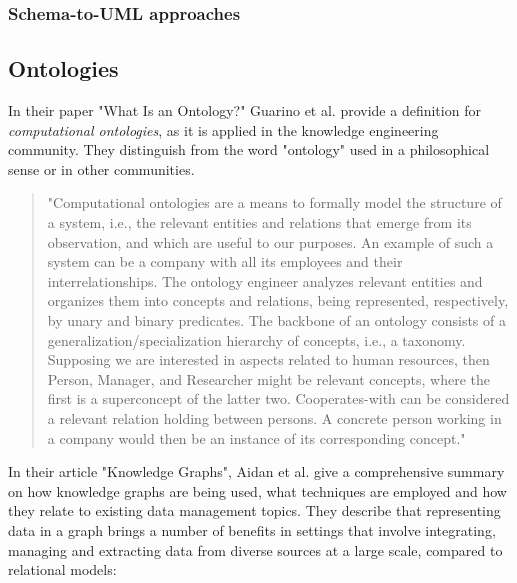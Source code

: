 \subsubsection{Schema-to-UML approaches}\label{subsubsec:schema-to-uml}

\subsection{Ontologies}
In their paper "What Is an Ontology?" Guarino et al. provide a definition for \textit{computational ontologies}, as it is applied in the knowledge engineering community.
They distinguish from the word "ontology" used in a philosophical sense or in other communities.\cite{guarino2009ontology}
\begin{quote}
	"Computational ontologies are a means to formally model the structure of a system, i.e., the relevant entities and relations that emerge from its observation, and which are useful to our purposes. An example of such a system can be a company with all its employees and their interrelationships. The ontology engineer analyzes relevant entities and organizes them into concepts and relations, being represented, respectively, by unary and binary predicates. The backbone of an ontology consists of a generalization/specialization hierarchy of concepts, i.e., a taxonomy. Supposing we are interested in aspects related to human resources, then Person, Manager, and Researcher might be relevant concepts, where the first is a superconcept of the latter two. Cooperates-with can be considered a relevant relation holding between persons. A concrete person working in a company would then be an instance of its corresponding concept."\cite{guarino2009ontology}
\end{quote}

In their article "Knowledge Graphs", Aidan et al. \cite{hogan2021knowledge} give a comprehensive summary on how knowledge graphs are being used, what techniques are employed and how they relate to existing data management topics.
They describe that representing data in a graph brings a number of benefits in settings that involve integrating, managing and extracting data from diverse sources at a large scale, compared to relational models:

